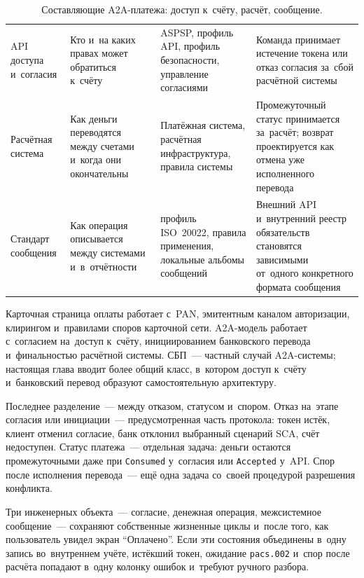 \begin{table}[tbp]
  \caption{Составляющие A2A-платежа: доступ к~счёту, расчёт,
  сообщение.}\label{tab:account-based-layers}
  \begingroup
  \tablesetup
  \setlength{\tabcolsep}{3pt}
  \begin{tabularx}{\textwidth}{
      @{}B{0.18\textwidth}
      Y
      Y
      Y@{}
    }
    \toprule
    \headrow
     &  &  &
     \\
    \midrule
    API доступа и~согласия &
    Кто и~на каких правах может обратиться к~счёту &
    ASPSP, профиль API, профиль безопасности, управление согласиями &
    Команда принимает истечение токена или отказ согласия за~сбой
    расчётной системы \\
    \rowsep
    Расчётная система &
    Как деньги переводятся между счетами и~когда они окончательны &
    Платёжная система, расчётная инфраструктура, правила системы &
    Промежуточный статус принимается за~расчёт; возврат проектируется
    как отмена уже исполненного перевода \\
    \rowsep
    Стандарт сообщения &
    Как операция описывается между системами и~в~отчётности &
    профиль ISO~20022, правила применения, локальные альбомы сообщений &
    Внешний API и~внутренний реестр обязательств становятся зависимыми от~одного
    конкретного формата сообщения \\
    \bottomrule
  \end{tabularx}\par
  \endgroup
\end{table}

Карточная страница оплаты работает с~PAN, эмитентным каналом авторизации,
клирингом и~правилами споров карточной сети. A2A-модель работает с~согласием
на~доступ к~счёту, инициированием банковского перевода и~финальностью расчётной
системы. СБП~--- частный случай A2A-системы; настоящая глава вводит более общий
класс, в~котором доступ к~счёту и~банковский перевод образуют самостоятельную
архитектуру.

Последнее разделение~--- между отказом, статусом и~спором. Отказ на~этапе
согласия или инициации~--- предусмотренная часть протокола: токен истёк, клиент
отменил согласие, банк отклонил выбранный сценарий SCA, счёт недоступен. Статус
платежа~--- отдельная задача: деньги остаются промежуточными даже при
\texttt{Consumed} у~согласия или \texttt{Accepted} у~API. Спор после исполнения
перевода~--- ещё одна задача со~своей процедурой разрешения конфликта.

Три инженерных объекта~--- согласие, денежная операция, межсистемное
сообщение~--- сохраняют собственные жизненные циклы и~после того, как
пользователь увидел экран \enquote{Оплачено}. Если эти состояния объединены
в~одну запись во~внутреннем учёте, истёкший токен, ожидание \texttt{pacs.002}
и~спор после расчёта попадают в~одну колонку ошибок и~требуют ручного разбора.


